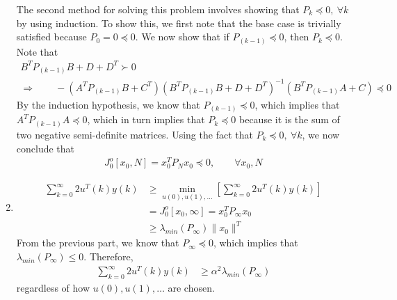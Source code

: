 \begin{enumerate}
The second method for solving this problem involves showing that $P_k \preceq 0, \ \forall k$ by using induction. To show this, we first note that the base case is trivially satisfied because $P_0 = 0 \preceq 0$. We now show that if $P_{(k-1)} \preceq 0$, then $P_k \preceq 0$. Note that
\begin{gather*}
    B^T P_{(k-1)} B + D + D^T \succ 0 \\
    \Rightarrow \qquad - (A^T P_{(k-1)} B + C^T) (B^T P_{(k-1)} B + D + D^T)^{-1}
        (B^T P_{(k-1)} A + C) \preceq 0
\end{gather*}
By the induction hypothesis, we know that $P_{(k-1)} \preceq 0$, which implies that $A^T P_{(k-1)} A \preceq 0$, which in turn implies that $P_k \preceq 0$ because it is the sum of two negative semi-definite matrices. Using the fact that $P_k \preceq 0, \ \forall k$, we now conclude that
\begin{align*}
    J_0^o[x_0,N] = x_0^T P_N x_0 \preceq 0, \qquad \forall x_0,N
\end{align*}



\item
\begin{align*}
    \sum_{k=0}^\infty 2u^T(k) y(k) & \geq \min_{u(0),u(1),\ldots} \left[ \sum_{k=0}^\infty 2u^T(k) y(k) \right] \\
    & = J_0^o[x_0,\infty] = x_0^T P_\infty x_0 \\
    & \geq \lambda_{min}(P_\infty) \| x_0 \|^T
\end{align*}
From the previous part, we know that $P_\infty \preceq 0$, which implies that $\lambda_{min}(P_\infty) \leq 0$. Therefore,
\begin{align*}
    \sum_{k=0}^\infty 2u^T(k) y(k) & \geq \alpha^2 \lambda_{min}(P_\infty)
\end{align*}
regardless of how $u(0),u(1),\ldots$ are chosen.

\end{enumerate}


